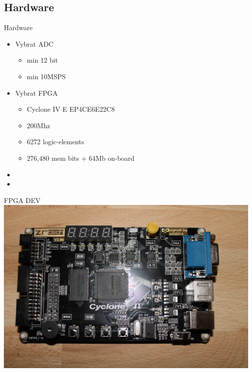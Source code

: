 \documentclass{beamer}
\begin{document}
	\subsection{Hardware}
	\begin{frame}{Hardware}
		\begin{itemize}
			\item Vybrat ADC
				\begin{itemize}
					\item min 12 bit 
					\item min 10MSPS
				\end{itemize}
			\item Vybrat FPGA
				\begin{itemize}
					\item Cyclone IV E EP4CE6E22C8
					\item 200Mhz
					\item 6272 logic-elements
					\item 276,480 mem bits + 64Mb on-board
				\end{itemize}			
			\item[]
			\item[]
		\end{itemize}
	\end{frame}

	\begin{frame}{FPGA DEV}
		\includegraphics[width=\paperwidth]{ZRtech_board.jpg}
	\end{frame}
	
\end{document}

